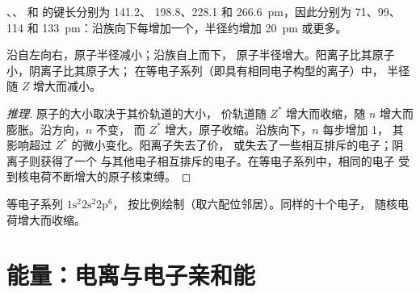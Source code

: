 \begin{example}[卤素]\label{ex:b1:periodicity:halogen-radii}
、、 和  的键长分别为 141.2、
198.8、228.1 和 \qty{266.6}{pm}，因此分别为 71、99、114
和 \qty{133}{pm}：沿族向下每增加一个，半径约增加
\qty{20}{pm} 或更多。
\end{example}

\begin{proposition}[半径的变化趋势]\label{prop:b1:periodicity:radius-trend}
沿自左向右，原子半径减小；沿族自上而下，
原子半径增大。阳离子比其原子小，阴离子比其原子大；
在等电子系列（即具有相同电子构型的离子）中，
半径随 $Z$ 增大而减小。
\end{proposition}

\begin{proof}[推理]
原子的大小取决于其价轨道的大小，
价轨道随 $Z^{*}$ 增大而收缩，随 $n$ 增大而膨胀。沿方向，$n$ 不变，
而 $Z^{*}$ 增大，原子收缩。沿族向下，$n$ 每步增加 1，
其影响超过 $Z^{*}$ 的微小变化。阳离子失去了价，
或失去了一些相互排斥的电子；阴离子则获得了一个
与其他电子相互排斥的电子。在等电子系列中，相同的电子
受到核电荷不断增大的原子核束缚。
\end{proof}

\begin{omfigure}

{\small 等电子系列 $1\text{s}^2 2\text{s}^2 2\text{p}^6$，
按比例绘制（取六配位邻居）。同样的十个电子，
随核电荷增大而收缩。}
\end{omfigure}

\section{能量：电离与电子亲和能}

